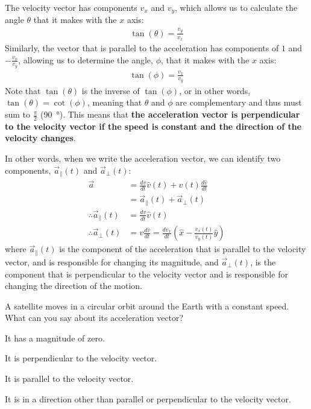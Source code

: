 The velocity vector has components $v_x$ and $v_y$, which allows us to calculate the angle $\theta$ that it makes with the $x$ axis:
\begin{align*}
\tan(\theta)=\frac{v_y}{v_x}
\end{align*}
Similarly, the vector that is parallel to the acceleration has components of $1$ and $-\frac{v_x}{v_y}$, allowing us to determine the angle, $\phi$, that it makes with the $x$ axis:
\begin{align*}
\tan(\phi)=\frac{v_x}{v_y}
\end{align*}
Note that $\tan(\theta)$ is the inverse of $\tan(\phi)$, or in other words, $\tan(\theta)=\cot(\phi)$, meaning that $\theta$ and $\phi$ are complementary and thus must sum to $\frac{\pi}{2}$ (\SI{90}{\degree}). This means that \textbf{the acceleration vector is perpendicular to the velocity vector if the speed is constant and the direction of the velocity changes}. 

In other words, when we write the acceleration vector, we can identify two components, $\vec a_{\parallel}(t)$ and $\vec a_{\perp}(t)$:
\begin{align*}
\vec a&=\frac{dv}{dt}\hat v(t)+v(t)\frac{d\hat v}{dt}\\
&=\vec a_{\parallel}(t) + \vec a_{\perp}(t)\\
\therefore \vec a_{\parallel}(t)&=\frac{dv}{dt}\hat v(t)\\
\therefore \vec a_{\perp}(t)&=v\frac{d\hat v}{dt}=\frac{dv_x}{dt} \left(\hat x - \frac{v_x(t)}{v_y(t)}\hat y\right)
\end{align*}
where $\vec a_{\parallel}(t)$ is the component of the acceleration that is parallel to the velocity vector, and is responsible for changing its magnitude, and $\vec a_{\perp}(t)$, is the component that is perpendicular to the velocity vector and is responsible for changing the direction of the motion.

\begin{checkpoint}{\begin{MCquestion}{A satellite moves in a circular orbit around the Earth with a constant speed. What can you say about its acceleration vector?}
\item It has a magnitude of zero.
\item It is perpendicular to the velocity vector.
\item It is parallel to the velocity vector.
\item It is in a direction other than parallel or perpendicular to the velocity vector.
\end{MCquestion}}
\end{checkpoint}

